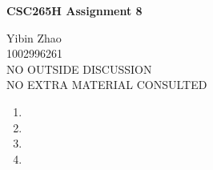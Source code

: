 \documentclass[10pt]{article}
\begin{document}
\begin{center}
{\bf \Large \bf CSC265H Assignment 8}
\end{center}

\noindent
Yibin Zhao\\
1002996261\\
NO OUTSIDE DISCUSSION\\
NO EXTRA MATERIAL CONSULTED\\

\begin{comment}
	A list of the vertices of a graph is the order they are visited during a
	breadth first search is called a breadth first search order of the graph.
	Similarly, a depth first search order of a graph is a list of the vertices
	of a graph in the order they are visited during a depth first search. 
	Note that the breadth first search order and depth first search order of a
	graph can depend on the order in which the children oeach node are
	enumerated.

	For any (directed or undirected) graph $G=(V,E)$, its squeare $G^2=(V,E^2)$
	is the graph with the same vertex set $V$ and with edge set consisting of
	all pairs of vertices that are distance one or two apart in $G$. 
	In other $G^2$ can be obtained from $G$ by adding new edges joining all
	pairs of vertices that are distance two apart in $G$.
\end{comment}

\begin{enumerate}
	\item
	\begin{comment}
		Prove that any breadth first search order of $G$ is also a breadth
		frist search order of $G^2$
	\end{comment}

	\item
	\begin{comment}
		Prove that, for some graph $G$, there is a breadth first search order
		of $G^2$ that is not a breadth first search order of $G$
	\end{comment}

	\item
	\begin{comment}
		Prove that, for some graph $G$, there is a depth first search order of
		$G$ that is not a depth first search order of $G^2$
	\end{comment}

	\item
	\begin{comment}
		Prove that, for some graph $G$, there is a depth frist search order of
		$G^2$ that is not a depth first search order of $G$
	\end{comment}
\end{enumerate}
\end{document}
